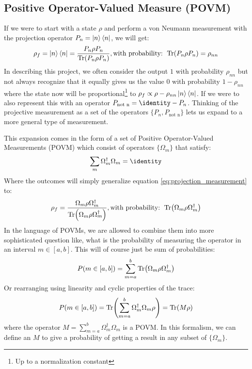 \subsection{Positive Operator-Valued Measure (POVM)}
If we were to start with a state $\rho$ and perform a von Neumann measurement with the projection operator $P_n = \ket{n}\bra{n}$, we will get:
\begin{equation}\label{eq:projection_measurement}
    \rho_f = \ket{n}\bra{n}= \frac{P_n \rho P_n}{\Tr(P_n \rho P_n)}, \text{with probability: } \Tr(P_n \rho P_n) = \rho_{nn}
\end{equation}
In describing this project, we often consider the output $1$ with probability $\rho_{nn}$ but not always recognize that it equally gives us the value $0$ with probability $1 - \rho_{nn}$ where the state now will be proportional\footnote{Up to a normalization constant} to $\rho_f \propto \rho - \rho_{nn}\ket{n}\bra{n}$. If we were to also represent this with an operator $P_{\text{not n}} = \identity - P_n$. Thinking of the projective measurement as a set of the operators $\{P_n, P_{\text{not n}}\}$ lets us expand to a more general type of measurement. 

This expansion comes in the form of a set of Positive Operator-Valued Measurements (POVM) which consist of operators $\{\Omega_m\}$ that satisfy:
\begin{equation}\label{eq:sum_requirement_POVM}
    \sum_m \Omega_m^\dagger \Omega_m = \identity
\end{equation}
Where the outcomes will simply generalize equation \ref{eq:projection_measurement} to:
\begin{equation}
        \rho_f = \frac{\Omega_m \rho  \Omega_m^\dagger}{\Tr(\Omega_m \rho \Omega_m^\dagger)}, \text{with probability: } \Tr(\Omega_m \rho \Omega_m^\dagger)
\end{equation}
In the language of POVMs, we are allowed to combine them into more sophisticated question like, what is the probability of measuring the operator in an interval $m\in[a, b]$. This will of course just be sum of probabilities: 
\begin{equation}
    P(m \in [a, b]) = \sum_{m = a}^b \Tr(\Omega_m\rho\Omega_m^\dagger)
\end{equation}
Or rearranging using linearity and cyclic properties of the trace:
\begin{equation}
    P(m \in [a, b]) = \Tr( \sum_{m = a}^b \Omega_m^\dagger \Omega_m\rho) = \Tr(M \rho)
\end{equation}
where the operator $M = \sum_{m = a}^b \Omega_m^\dagger \Omega_m$ is a POVM. In this formalism, we can define an $M$ to give a probability of getting a result in any subset of $\{\Omega_m\}$. 

